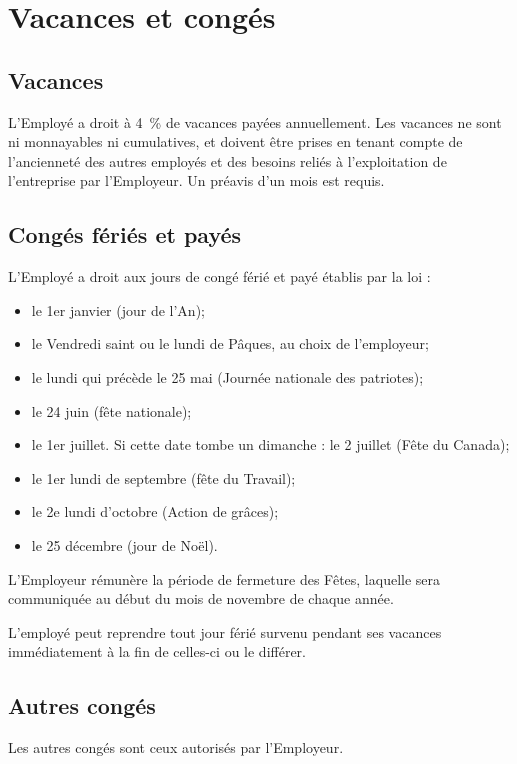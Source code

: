 \documentclass{article}
\begin{document}
    \section{Vacances et congés}
    	\subsection{Vacances}
    	L'Employé a droit à \SI{4}{\%} de vacances payées annuellement. Les vacances ne sont ni monnayables ni cumulatives, et doivent être prises en tenant compte de l'ancienneté des autres employés et des besoins reliés à l'exploitation de l'entreprise par l'Employeur. Un préavis d'un mois est requis.    	
    	
    	\subsection{Congés fériés et payés}
    	L'Employé a droit aux jours de congé férié et payé établis par la loi :
    	
    	\begin{itemize}
    		\item le 1er janvier (jour de l’An);
			\item le Vendredi saint ou le lundi de Pâques, au choix de l’employeur;
			\item le lundi qui précède le 25 mai (Journée nationale des patriotes);
			\item le 24 juin (fête nationale);
			\item le 1er juillet. Si cette date tombe un dimanche : le 2 juillet (Fête du Canada);
			\item le 1er lundi de septembre (fête du Travail);
			\item le 2e lundi d’octobre (Action de grâces);
			\item le 25 décembre (jour de Noël).
    	\end{itemize}
    	
    	L'Employeur rémunère la période de fermeture des Fêtes, laquelle sera communiquée au début du mois de novembre de chaque année.
    	
    	 L'employé peut reprendre tout jour férié survenu pendant ses vacances immédiatement à la fin de celles-ci ou le différer.
    	
    	\subsection{Autres congés}
    	Les autres congés sont ceux autorisés par l'Employeur.
    	
\end{document}
